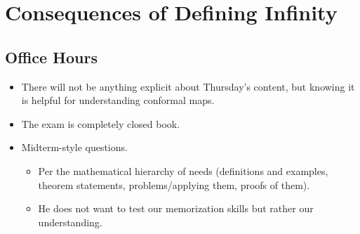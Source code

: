 \documentclass[../notes.tex]{subfiles}
\begin{document}
\chapter{Consequences of Defining Infinity}
\section{Office Hours}
\begin{itemize}
    \item {}There will not be anything explicit about Thursday's content, but knowing it is helpful for understanding conformal maps.
    \item The exam is completely closed book.
    \item Midterm-style questions.
    \begin{itemize}
        \item Per the mathematical hierarchy of needs (definitions and examples, theorem statements, problems/applying them, proofs of them).
        \item He does not want to test our memorization skills but rather our understanding.
    \end{itemize}
\end{itemize}
\end{document}
